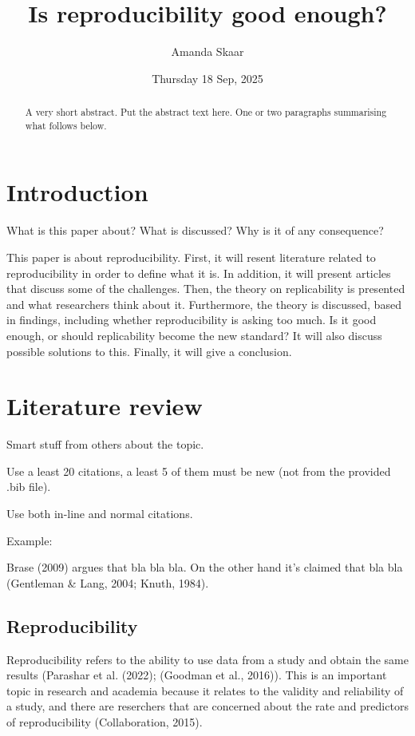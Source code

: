 \documentclass[
  a4paper,
]{article}
\title{Is reproducibility good enough?}
\author{Amanda Skaar}
\date{Thursday 18 Sep, 2025}
\begin{document}
\maketitle
\begin{abstract}
A very short abstract. Put the abstract text here. One or two paragraphs
summarising what follows below.
\end{abstract}


\section{Introduction}\label{introduction}

What is this paper about? What is discussed? Why is it of any
consequence?

This paper is about reproducibility. First, it will resent literature
related to reproducibility in order to define what it is. In addition,
it will present articles that discuss some of the challenges. Then, the
theory on replicability is presented and what researchers think about
it. Furthermore, the theory is discussed, based in findings, including
whether reproducibility is asking too much. Is it good enough, or should
replicability become the new standard? It will also discuss possible
solutions to this. Finally, it will give a conclusion.

\section{Literature review}\label{literature-review}

Smart stuff from others about the topic.

Use a least 20 citations, a least 5 of them must be new (not from the
provided .bib file).

Use both in-line and normal citations.

Example:

Brase (2009) argues that bla bla bla. On the other hand it's claimed
that bla bla (Gentleman \& Lang, 2004; Knuth, 1984).

\subsection{Reproducibility}\label{reproducibility}

Reproducibility refers to the ability to use data from a study and
obtain the same results (Parashar et al. (2022); (Goodman et al.,
2016)). This is an important topic in research and academia because it
relates to the validity and reliability of a study, and there are
reserchers that are concerned about the rate and predictors of
reproducibility (Collaboration, 2015).
\end{document}
